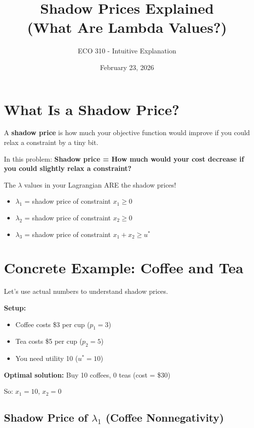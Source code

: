 \documentclass[11pt]{article}
\title{Shadow Prices Explained \\ (What Are Lambda Values?)}
\author{ECO 310 - Intuitive Explanation}
\date{February 23, 2026}
\begin{document}
\maketitle

\section{What Is a Shadow Price?}

\begin{tcolorbox}[colback=blue!5!white,colframe=blue!75!black,title=Simple Definition]
A \textbf{shadow price} is how much your objective function would improve if you could relax a constraint by a tiny bit.

In this problem: \textbf{Shadow price = How much would your cost decrease if you could slightly relax a constraint?}
\end{tcolorbox}

The $\lambda$ values in your Lagrangian ARE the shadow prices!

\begin{itemize}
\item $\lambda_1$ = shadow price of constraint $x_1 \geq 0$
\item $\lambda_2$ = shadow price of constraint $x_2 \geq 0$
\item $\lambda_3$ = shadow price of constraint $x_1 + x_2 \geq u^*$
\end{itemize}

\section{Concrete Example: Coffee and Tea}

Let's use actual numbers to understand shadow prices.

\textbf{Setup:}
\begin{itemize}
\item Coffee costs \$3 per cup ($p_1 = 3$)
\item Tea costs \$5 per cup ($p_2 = 5$)
\item You need utility 10 ($u^* = 10$)
\end{itemize}

\textbf{Optimal solution:} Buy 10 coffees, 0 teas (cost = \$30)

So: $x_1 = 10$, $x_2 = 0$

\subsection{Shadow Price of $\lambda_1$ (Coffee Nonnegativity)}
\end{document}
